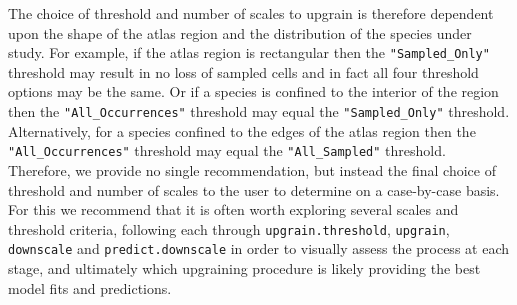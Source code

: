 \documentclass{article}[12pt, a4paper]
\begin{document}
The choice of threshold and number of scales to upgrain is therefore dependent upon the shape of the atlas region and the distribution of the species under study. For example, if the atlas region is rectangular then the \texttt{"Sampled\_Only"} threshold may result in no loss of sampled cells and in fact all four threshold options may be the same. Or if a species is confined to the interior of the region then the \texttt{"All\_Occurrences"} threshold may equal the \texttt{"Sampled\_Only"} threshold. Alternatively, for a species confined to the edges of the atlas region then the \texttt{"All\_Occurrences"} threshold may equal the \texttt{"All\_Sampled"} threshold. Therefore, we provide no single recommendation, but instead the final choice of threshold and number of scales to the user to determine on a case-by-case basis. For this we recommend that it is often worth exploring several scales and threshold criteria, following each through \texttt{upgrain.threshold}, \texttt{upgrain}, \texttt{downscale} and \texttt{predict.downscale} in order to visually assess the process at each stage, and ultimately which upgraining procedure is likely providing the best model fits and predictions.
\end{document}

